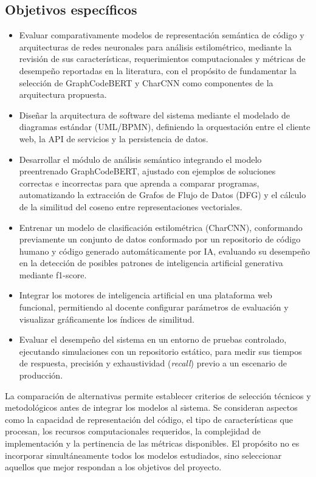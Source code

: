 \subsection{Objetivos específicos}
\begin{itemize}
    \item Evaluar comparativamente modelos de representación semántica de código y arquitecturas de redes neuronales para análisis estilométrico, mediante la revisión de sus características, requerimientos computacionales y métricas de desempeño reportadas en la literatura, con el propósito de fundamentar la selección de GraphCodeBERT y CharCNN como componentes de la arquitectura propuesta.
    \item Diseñar la arquitectura de software del sistema mediante el modelado de diagramas estándar (UML/BPMN), definiendo la orquestación entre el cliente web, la API de servicios y la persistencia de datos.
    \item Desarrollar el módulo de análisis semántico integrando el modelo preentrenado GraphCodeBERT, ajustado con ejemplos de soluciones correctas e incorrectas para que aprenda a comparar programas, automatizando la extracción de Grafos de Flujo de Datos (DFG) y el cálculo de la similitud del coseno entre representaciones vectoriales.
    \item Entrenar un modelo de clasificación estilométrica (CharCNN), conformando previamente un conjunto de datos conformado por un repositorio de código humano y código generado automáticamente por IA, evaluando su desempeño en la detección de posibles patrones de inteligencia artificial generativa mediante f1-score.
    \item Integrar los motores de inteligencia artificial en una plataforma web funcional, permitiendo al docente configurar parámetros de evaluación y visualizar gráficamente los índices de similitud.
    \item Evaluar el desempeño del sistema en un entorno de pruebas controlado, ejecutando simulaciones con un repositorio estático, para medir sus tiempos de respuesta, precisión y exhaustividad (\textit{recall}) previo a un escenario de producción.
\end{itemize}

La comparación de alternativas permite establecer criterios de selección técnicos y metodológicos antes de integrar los modelos al sistema. Se consideran aspectos como la capacidad de representación del código, el tipo de características que procesan, los recursos computacionales requeridos, la complejidad de implementación y la pertinencia de las métricas disponibles. El propósito no es incorporar simultáneamente todos los modelos estudiados, sino seleccionar aquellos que mejor respondan a los objetivos del proyecto.